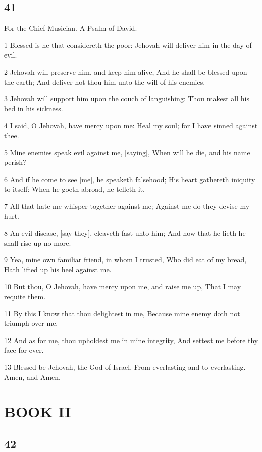 \chapter{41}

\par For the Chief Musician. A Psalm of David.

\par 1 Blessed is he that considereth the poor: Jehovah will deliver him in the day of evil.
\par 2 Jehovah will preserve him, and keep him alive, And he shall be blessed upon the earth; And deliver not thou him unto the will of his enemies.
\par 3 Jehovah will support him upon the couch of languishing: Thou makest all his bed in his sickness.
\par 4 I said, O Jehovah, have mercy upon me: Heal my soul; for I have sinned against thee.
\par 5 Mine enemies speak evil against me, [saying], When will he die, and his name perish?
\par 6 And if he come to see [me], he speaketh falsehood; His heart gathereth iniquity to itself: When he goeth abroad, he telleth it.
\par 7 All that hate me whisper together against me; Against me do they devise my hurt.
\par 8 An evil disease, [say they], cleaveth fast unto him; And now that he lieth he shall rise up no more.
\par 9 Yea, mine own familiar friend, in whom I trusted, Who did eat of my bread, Hath lifted up his heel against me.
\par 10 But thou, O Jehovah, have mercy upon me, and raise me up, That I may requite them.
\par 11 By this I know that thou delightest in me, Because mine enemy doth not triumph over me.
\par 12 And as for me, thou upholdest me in mine integrity, And settest me before thy face for ever.
\par 13 Blessed be Jehovah, the God of Israel, From everlasting and to everlasting. Amen, and Amen.

\part{BOOK II}

\chapter{42}

